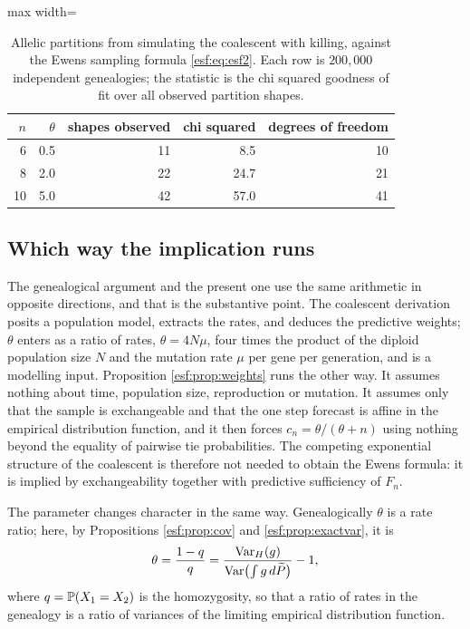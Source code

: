 \begin{table}[htbp]
\centering
\caption{Allelic partitions from simulating the coalescent with killing, against the
Ewens sampling formula \eqref{esf:eq:esf2}. Each row is $200{,}000$ independent
genealogies; the statistic is the chi squared goodness of fit over all observed
partition shapes.}
\label{esf:tab:coal}
\begin{adjustbox}{max width=\textwidth}
\begin{tabular}{rrrrr}
\toprule
$n$ & $\theta$ & shapes observed & chi squared & degrees of freedom \\
\midrule
 6 & 0.5 & 11 &  8.5 & 10 \\
 8 & 2.0 & 22 & 24.7 & 21 \\
10 & 5.0 & 42 & 57.0 & 41 \\
\bottomrule
\end{tabular}
\end{adjustbox}
\end{table}

\subsection{Which way the implication runs}

The genealogical argument and the present one use the same arithmetic in opposite
directions, and that is the substantive point. The coalescent derivation posits a
population model, extracts the rates, and deduces the predictive weights; $\theta$
enters as a ratio of rates, $\theta = 4N\mu$, four times the product of the diploid
population size $N$ and the mutation rate $\mu$ per gene per generation, and is a
modelling input. Proposition \ref{esf:prop:weights} runs the other way. It
assumes nothing about time, population size, reproduction or mutation. It assumes only
that the sample is exchangeable and that the one step forecast is affine in the
empirical distribution function, and it then forces $c_n = \theta/(\theta+n)$ using
nothing beyond the equality of pairwise tie probabilities. The competing exponential
structure of the coalescent is therefore not needed to obtain the Ewens formula: it is
implied by exchangeability together with predictive sufficiency of $F_n$.

The parameter changes character in the same way. Genealogically $\theta$ is a rate
ratio; here, by Propositions \ref{esf:prop:cov} and \ref{esf:prop:exactvar}, it is
\[
\theta = \frac{1-q}{q} = \frac{\operatorname{Var}_H(g)}{\operatorname{Var} \bigl( \int g \, d\widetilde{P} \bigr)} - 1 ,
\]
where $q = \mathbb{P}(X_1 = X_2)$ is the homozygosity, so that a ratio of rates in the
genealogy is a ratio of variances of the limiting empirical distribution function.

